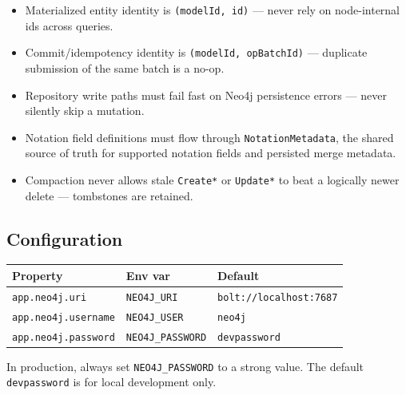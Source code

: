 \begin{itemize}
\item Materialized entity identity is \texttt{(modelId, id)} --- never rely
  on node-internal ids across queries.
\item Commit/idempotency identity is \texttt{(modelId, opBatchId)} ---
  duplicate submission of the same batch is a no-op.
\item Repository write paths must fail fast on Neo4j persistence errors ---
  never silently skip a mutation.
\item Notation field definitions must flow through
  \texttt{NotationMetadata}, the shared source of truth for supported
  notation fields and persisted merge metadata.
\item Compaction never allows stale \texttt{Create*} or \texttt{Update*} to
  beat a logically newer delete --- tombstones are retained.
\end{itemize}

\subsection{Configuration}

\begin{longtable}{p{42mm}p{50mm}p{62mm}}
\toprule
Property & Env var & Default \\
\midrule
\texttt{app.neo4j.uri} & \texttt{NEO4J\_URI} &
  \texttt{bolt://localhost:7687} \\
\texttt{app.neo4j.username} & \texttt{NEO4J\_USER} & \texttt{neo4j} \\
\texttt{app.neo4j.password} & \texttt{NEO4J\_PASSWORD} &
  \texttt{devpassword} \\
\bottomrule
\end{longtable}

In production, always set \texttt{NEO4J\_PASSWORD} to a strong value. The
default \texttt{devpassword} is for local development only.
